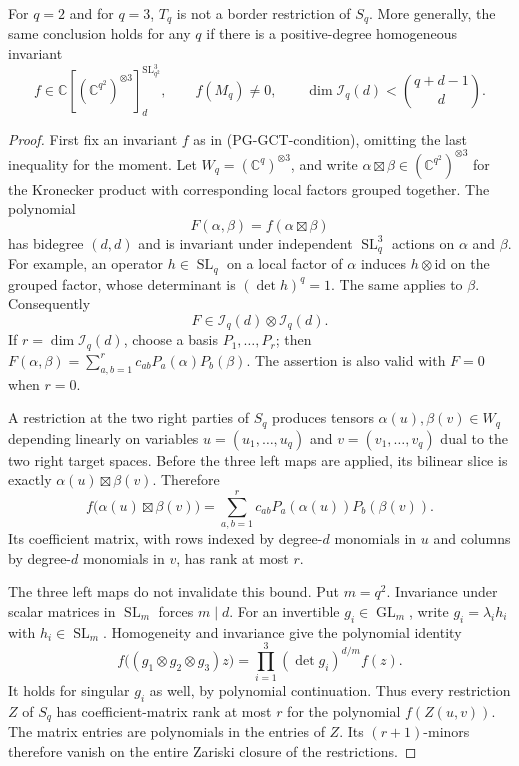 \begin{theorem}
\label{pg:gct-pent}
For $q=2$ and for $q=3$, $T_q$ is not a border restriction of $S_q$.
More generally, the same conclusion holds for any $q$ if there is a
positive-degree homogeneous invariant
\[
 f\in\mathbb C[(\mathbb C^{q^2})^{\otimes3}]
 ^{\operatorname{SL}_{q^2}^3}_d,
 \qquad f(M_q)\ne0,
 \qquad
 \dim\mathcal I_q(d)<\binom{q+d-1}{d}.
 \tag{PG-GCT-condition}
\]
\end{theorem}
\begin{proof}
First fix an invariant $f$ as in (PG-GCT-condition), omitting the last
inequality for the moment. Let
$W_q=(\mathbb C^q)^{\otimes3}$, and write
$\alpha\boxtimes\beta\in(\mathbb C^{q^2})^{\otimes3}$ for the
Kronecker product with corresponding local factors grouped together.
The polynomial
\[
 F(\alpha,\beta)=f(\alpha\boxtimes\beta)
\]
has bidegree $(d,d)$ and is invariant under independent
$\operatorname{SL}_q^3$ actions on $\alpha$ and $\beta$.
For example, an operator $h\in\operatorname{SL}_q$ on a local factor
of $\alpha$ induces $h\otimes\mathrm{id}$ on the grouped factor,
whose determinant is $(\det h)^q=1$. The same applies to $\beta$.
Consequently
\[
 F\in\mathcal I_q(d)\otimes\mathcal I_q(d).
\]
If $r=\dim\mathcal I_q(d)$, choose a basis $P_1,\ldots,P_r$;
then $F(\alpha,\beta)=\sum_{a,b=1}^r c_{ab}P_a(\alpha)P_b(\beta)$.
The assertion is also valid with $F=0$ when $r=0$.

A restriction at the two right parties of $S_q$ produces tensors
$\alpha(u),\beta(v)\in W_q$ depending linearly on variables
$u=(u_1,\ldots,u_q)$ and $v=(v_1,\ldots,v_q)$ dual to the two
right target spaces. Before the three left maps are applied, its
bilinear slice is exactly $\alpha(u)\boxtimes\beta(v)$. Therefore
\[
 f\bigl(\alpha(u)\boxtimes\beta(v)\bigr)
 =\sum_{a,b=1}^r c_{ab}P_a(\alpha(u))P_b(\beta(v)).
 \tag{PG-GCT-separation}
\]
Its coefficient matrix, with rows indexed by degree-$d$ monomials in
$u$ and columns by degree-$d$ monomials in $v$, has rank at most $r$.

The three left maps do not invalidate this bound. Put $m=q^2$.
Invariance under scalar matrices in $\operatorname{SL}_m$ forces
$m\mid d$. For an invertible $g_i\in\operatorname{GL}_m$, write
$g_i=\lambda_i h_i$ with $h_i\in\operatorname{SL}_m$. Homogeneity
and invariance give the polynomial identity
\[
 f\bigl((g_1\otimes g_2\otimes g_3)z\bigr)
 =\prod_{i=1}^3(\det g_i)^{d/m} f(z).
 \tag{PG-GCT-character}
\]
It holds for singular $g_i$ as well, by polynomial continuation.
Thus every restriction $Z$ of $S_q$ has coefficient-matrix rank at
most $r$ for the polynomial $f(Z(u,v))$. The matrix entries are
polynomials in the entries of $Z$. Its $(r+1)$-minors therefore vanish
on the entire Zariski closure of the restrictions.


\end{proof}
